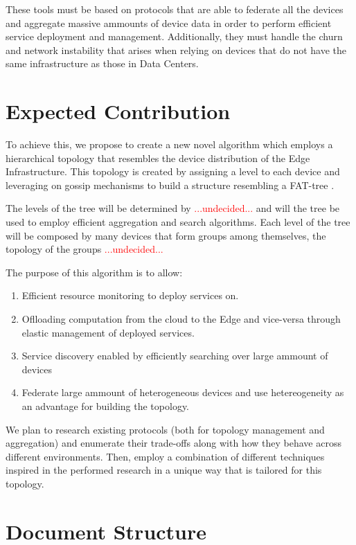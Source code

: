 These tools must be based on protocols that are able to federate all the devices 
and aggregate massive ammounts of device data in order to perform efficient service deployment and management. Additionally, they must handle the churn and network instability that arises when relying on devices that do not have the same infrastructure as those in Data Centers.

\section{Expected Contribution}

To achieve this, we propose to create a new novel algorithm which employs a hierarchical topology
that resembles the device distribution of the Edge Infrastructure. This topology is created by
assigning a level to each device and leveraging on gossip mechanisms to build a structure resembling a FAT-tree \cite{}.

The levels of the tree will be determined by \textcolor{red}{...undecided...} and will the tree be used to employ
efficient aggregation and search algorithms. Each level of the tree will be composed by many devices that form groups 
among themselves, the topology of the groups \textcolor{red}{...undecided...} 

The purpose of this algorithm is to allow:

\begin{enumerate} 
    \item Efficient resource monitoring to deploy services on.
    \item Oflloading computation from the cloud to the Edge and vice-versa through elastic management of deployed services.
    \item Service discovery enabled by efficiently searching over large ammount of devices
    \item Federate large ammount of heterogeneous devices and use hetereogeneity as an advantage for building the topology.
\end{enumerate}

We plan to research existing protocols (both for topology management and aggregation)
and enumerate their trade-offs along with how they behave across different environments. 
Then, employ a combination of different techniques inspired in the performed research 
in a unique way that is tailored for this topology.

\section{Document Structure}


